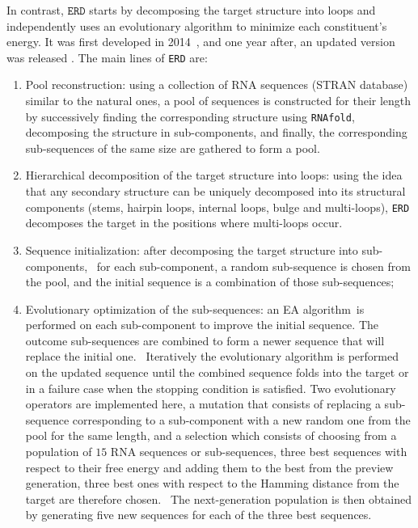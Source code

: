 In contrast, \(\texttt{ERD}\) starts by decomposing the target structure into loops and independently uses an evolutionary algorithm to minimize each constituent's energy. It was first developed in 2014 \cite{esmaili2014evolutionary}, and one year after, an updated version was released \cite{esmaili2015erd}. The main lines of \texttt{ERD} are:
\begin{enumerate}
	\item Pool reconstruction: using a collection of \ac{RNA} sequences (STRAN database) similar to the natural ones, a pool of sequences is constructed for their length by successively finding the corresponding structure using \texttt{RNAfold}, decomposing the structure in sub-components, and finally, the corresponding sub-sequences of the same size are gathered to form a pool. 
	\item Hierarchical decomposition of the target structure into loops: using the idea that any secondary structure can be uniquely decomposed into its structural components (stems, hairpin loops, internal loops, bulge and multi-loops), \texttt{ERD} decomposes the target in the positions where multi-loops occur. 
	\item Sequence initialization: after decomposing the target structure into sub-components,  for each sub-component, a random sub-sequence is chosen from the pool, and the initial sequence is a combination of those sub-sequences; 
	\item Evolutionary optimization of the sub-sequences: an EA algorithm is performed on each sub-component to improve the initial sequence. The outcome sub-sequences are combined to form a newer sequence that will replace the initial one.  Iteratively the evolutionary algorithm is performed on the updated sequence until the combined sequence folds into the target or in a failure case when the stopping condition is satisfied. Two evolutionary operators are implemented here, a mutation that consists of replacing a sub-sequence corresponding to a sub-component with a new random one from the pool for the same length, and a selection which consists of choosing from a population of $15$ \ac{RNA} sequences or sub-sequences, three best sequences with respect to their free energy and adding them to the best from the preview generation, three best ones with respect to the Hamming distance from the target are therefore chosen.  The next-generation population is then obtained by generating five new sequences for each of the three best sequences.
\end{enumerate}

